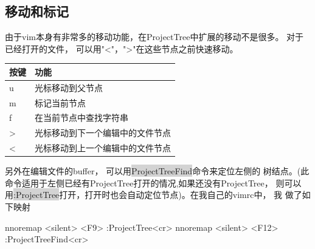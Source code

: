 \documentclass[oneside,openany]{book}
\begin{document}
  \subsection{移动和标记}
  由于vim本身有非常多的移动功能，在ProjectTree中扩展的移动不是很多。 对于已经打开的文件，
可以用"<"，">"在这些节点之前快速移动。
  \begin{table}[H]
  \centering
      \begin{tabular}{p{40pt}p{220pt}}
        \toprule
        按键& 功能\\
        \midrule
          u     &光标移动到父节点\\
          m     &标记当前节点\\
          f     &在当前节点中查找字符串\\
          >     &光标移动到下一个编辑中的文件节点\\
          <     &光标移动到上一个编辑中的文件节点\\
      \bottomrule
      \end{tabular}
  \end{table}
  另外在编辑文件的buffer， 可以用\colorbox{lightgray}{ProjectTreeFind}命令来定位左侧的
树结点。(此命令适用于左侧已经有ProjectTree打开的情况,如果还没有ProjectTree，
则可以用\colorbox{lightgray}{:ProjectTree}打开，打开时也会自动定位节点)。在我自己的vimrc中， 我
做了如下映射
  \begin{mdframed}[style=SmallFrame]
    \begin{flushleft}
      nnoremap <silent> <F9>  :ProjectTree<cr>\newline
      nnoremap <silent> <F12> :ProjectTreeFind<cr>
    \end{flushleft}
  \end{mdframed}
\end{document}
